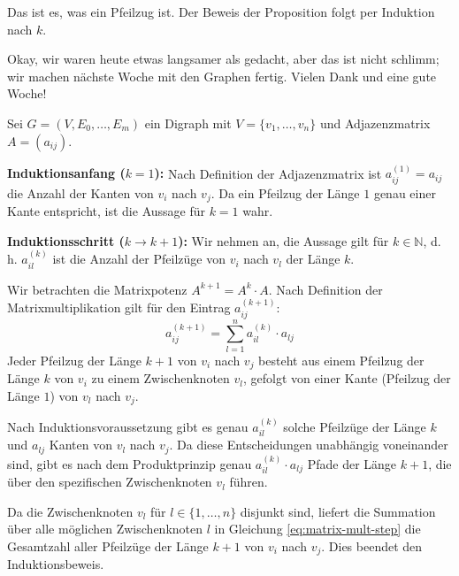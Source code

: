 \begin{spoken-clean}[01:21:54 - 01:25:38]
Das ist es, was ein Pfeilzug ist. Der Beweis der Proposition folgt per Induktion nach $k$.

Okay, wir waren heute etwas langsamer als gedacht, aber das ist nicht schlimm; wir machen nächste Woche mit den Graphen fertig. Vielen Dank und eine gute Woche!
\end{spoken-clean}

\begin{math-stroke}
\begin{short-proof}
Sei $G = (V, E_0, \dots, E_m)$ ein Digraph mit $V = \{v_1, \dots, v_n\}$ und Adjazenzmatrix $A = (a_{ij})$.

\textbf{Induktionsanfang ($k=1$):}
Nach Definition der Adjazenzmatrix ist $a_{ij}^{(1)} = a_{ij}$ die Anzahl der Kanten von $v_i$ nach $v_j$. Da ein Pfeilzug der Länge $1$ genau einer Kante entspricht, ist die Aussage für $k=1$ wahr.

\textbf{Induktionsschritt ($k \to k+1$):}
Wir nehmen an, die Aussage gilt für $k \in \mathbb{N}$, d.\,h. $a_{il}^{(k)}$ ist die Anzahl der Pfeilzüge von $v_i$ nach $v_l$ der Länge $k$.

Wir betrachten die Matrixpotenz $A^{k+1} = A^k \cdot A$. Nach Definition der Matrixmultiplikation gilt für den Eintrag $a_{ij}^{(k+1)}$:
\begin{equation}\label{eq:matrix-mult-step}
a_{ij}^{(k+1)} = \sum_{l=1}^n a_{il}^{(k)} \cdot a_{lj}
\end{equation}
Jeder Pfeilzug der Länge $k+1$ von $v_i$ nach $v_j$ besteht aus einem Pfeilzug der Länge $k$ von $v_i$ zu einem Zwischenknoten $v_l$, gefolgt von einer Kante (Pfeilzug der Länge $1$) von $v_l$ nach $v_j$.

Nach Induktionsvoraussetzung gibt es genau $a_{il}^{(k)}$ solche Pfeilzüge der Länge $k$ und $a_{lj}$ Kanten von $v_l$ nach $v_j$. Da diese Entscheidungen unabhängig voneinander sind, gibt es nach dem Produktprinzip genau $a_{il}^{(k)} \cdot a_{lj}$ Pfade der Länge $k+1$, die über den spezifischen Zwischenknoten $v_l$ führen.

Da die Zwischenknoten $v_l$ für $l \in \{1, \dots, n\}$ disjunkt sind, liefert die Summation über alle möglichen Zwischenknoten $l$ in Gleichung \eqref{eq:matrix-mult-step} die Gesamtzahl aller Pfeilzüge der Länge $k+1$ von $v_i$ nach $v_j$. Dies beendet den Induktionsbeweis.
\end{short-proof}
\end{math-stroke}

